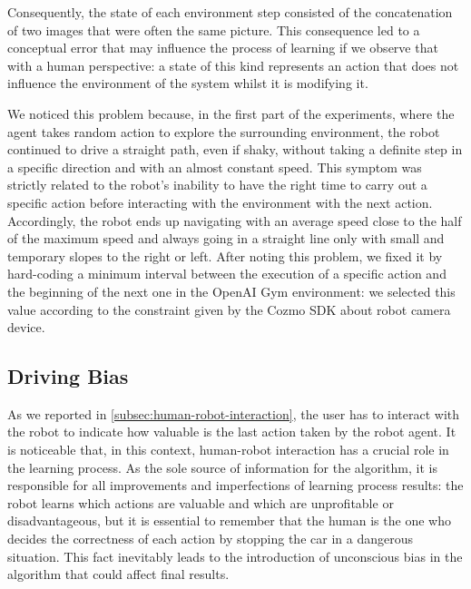 Consequently, the state of each environment step consisted of the concatenation of two images that were often the same picture.
This consequence led to a conceptual error that may influence the process of learning if we observe that with a human perspective: a state of this kind represents an action that does not influence the environment of the system whilst it is modifying it.

We noticed this problem because, in the first part of the experiments, where the agent takes random action to explore the surrounding environment, the robot continued to drive a straight path, even if shaky, without taking a definite step in a specific direction and with an almost constant speed.
This symptom was strictly related to the robot's inability to have the right time to carry out a specific action before interacting with the environment with the next action.
Accordingly, the robot ends up navigating with an average speed close to the half of the maximum speed and always going in a straight line only with small and temporary slopes to the right or left.
After noting this problem, we fixed it by hard-coding a minimum interval between the execution of a specific action and the beginning of the next one in the OpenAI Gym environment: we selected this value according to the constraint given by the Cozmo SDK about robot camera device.

\subsection{Driving Bias}

As we reported in \vref{subsec:human-robot-interaction}, the user has to interact with the robot to indicate how valuable is the last action taken by the robot agent. It is noticeable that, in this context, human-robot interaction has a crucial role in the learning process.
As the sole source of information for the algorithm, it is responsible for all improvements and imperfections of learning process results: the robot learns which actions are valuable and which are unprofitable or disadvantageous, but it is essential to remember that the human is the one who decides the correctness of each action by stopping the car in a dangerous situation.
This fact inevitably leads to the introduction of unconscious bias in the algorithm that could affect final results.

